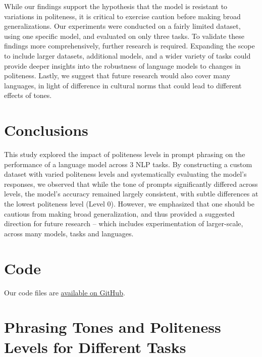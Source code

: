 \documentclass[11pt]{article}
\begin{document}
While our findings support the hypothesis that the model is resistant to variations in politeness, it is critical to exercise caution before making broad generalizations. Our experiments were conducted on a fairly limited dataset, using one specific model, and evaluated on only three tasks. To validate these findings more comprehensively, further research is required. Expanding the scope to include larger datasets, additional models, and a wider variety of tasks could provide deeper insights into the robustness of language models to changes in politeness. Lastly, we suggest that future research would also cover many languages, in light of difference in cultural norms that could lead to different effects of tones.

\section{Conclusions}
This study explored the impact of politeness levels in prompt phrasing on the performance of a language model across 3 NLP tasks. By constructing a custom dataset with varied politeness levels and systematically evaluating the model's responses, we observed that while the tone of prompts significantly differed across levels, the model’s accuracy remained largely consistent, with subtle differences at the lowest politeness level (Level 0). However, we emphasized that one should be cautious from making broad generalization, and thus provided a suggested direction for future research -- which includes experimentation of larger-scale, across many models, tasks and languages.




\appendix
\section{Code}
\label{sec:code-appendix}

Our code files are \href{https://github.com/DanD2021/NLP-PROJECT}{available on GitHub}.

\section{Phrasing Tones and Politeness Levels for Different Tasks}
\label{sec:levels-appendix}
\end{document}
